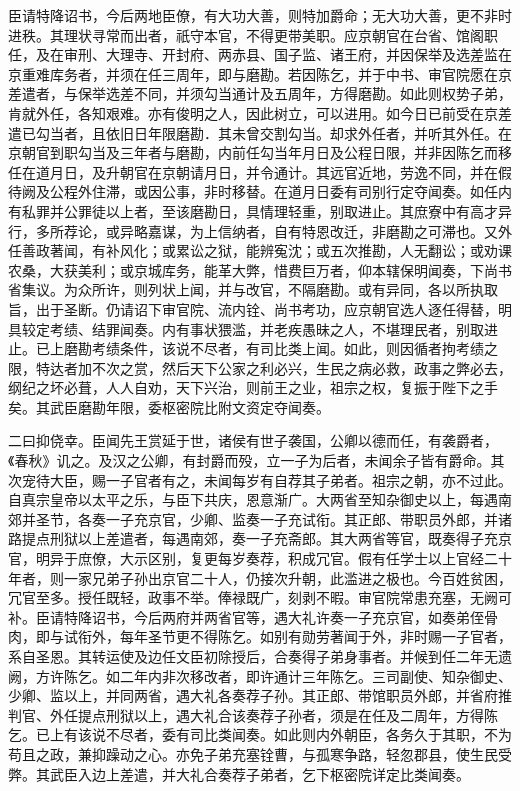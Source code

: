 \documentclass[UTF8,titlepage,oneside]{ctexbook}
\begin{document}
臣请特降诏书，今后两地臣僚，有大功大善，则特加爵命；无大功大善，更不非时进秩。其理状寻常而出者，祇守本官，不得更带美职。应京朝官在台省、馆阁职任，及在审刑、大理寺、开封府、两赤县、国子监、诸王府，并因保举及选差监在京重难库务者，并须在任三周年，即与磨勘。若因陈乞，并于中书、审官院愿在京差遣者，与保举选差不同，并须勾当通计及五周年，方得磨勘。如此则权势子弟，肯就外任，各知艰难。亦有俊明之人，因此树立，可以进用。如今日已前受在京差遣已勾当者，且依旧日年限磨勘．其未曾交割勾当。却求外任者，并听其外任。在京朝官到职勾当及三年者与磨勘，内前任勾当年月日及公程日限，并非因陈乞而移任在道月日，及升朝官在京朝请月日，并令通计。其远官近地，劳逸不同，并在假待阙及公程外住滞，或因公事，非时移替。在道月日委有司别行定夺闻奏。如任内有私罪并公罪徒以上者，至该磨勘日，具情理轻重，别取进止。其庶寮中有高才异行，多所荐论，或异略嘉谋，为上信纳者，自有特恩改迁，非磨勘之可滞也。又外任善政著闻，有补风化；或累讼之狱，能辨寃沈；或五次推勘，人无翻讼；或劝课农桑，大获美利；或京城库务，能革大弊，惜费巨万者，仰本辖保明闻奏，下尚书省集议。为众所许，则列状上闻，并与改官，不隔磨勘。或有异同，各以所执取旨，出于圣断。仍请诏下审官院、流内铨、尚书考功，应京朝官选人逐任得替，明具较定考绩、结罪闻奏。内有事状猥滥，并老疾愚昧之人，不堪理民者，别取进止。已上磨勘考绩条件，该说不尽者，有司比类上闻。如此，则因循者拘考绩之限，特达者加不次之赏，然后天下公家之利必兴，生民之病必救，政事之弊必去，纲纪之坏必葺，人人自劝，天下兴治，则前王之业，祖宗之权，复振于陛下之手矣。其武臣磨勘年限，委枢密院比附文资定夺闻奏。


二曰抑侥幸。臣闻先王赏延于世，诸侯有世子袭国，公卿以德而任，有袭爵者，《春秋》讥之。及汉之公卿，有封爵而殁，立一子为后者，未闻余子皆有爵命。其次宠待大臣，赐一子官者有之，未闻每岁有自荐其子弟者。祖宗之朝，亦不过此。自真宗皇帝以太平之乐，与臣下共庆，恩意渐广。大两省至知杂御史以上，每遇南郊并圣节，各奏一子充京官，少卿、监奏一子充试衔。其正郎、带职员外郎，并诸路提点刑狱以上差遣者，每遇南郊，奏一子充斋郎。其大两省等官，既奏得子充京官，明异于庶僚，大示区别，复更每岁奏荐，积成冗官。假有任学士以上官经二十年者，则一家兄弟子孙出京官二十人，仍接次升朝，此滥进之极也。今百姓贫困，冗官至多。授任既轻，政事不举。俸禄既广，刻剥不暇。审官院常患充塞，无阙可补。臣请特降诏书，今后两府并两省官等，遇大礼许奏一子充京官，如奏弟侄骨肉，即与试衔外，每年圣节更不得陈乞。如别有勋劳著闻于外，非时赐一子官者，系自圣恩。其转运使及边任文臣初除授后，合奏得子弟身事者。并候到任二年无遗阙，方许陈乞。如二年内非次移改者，即许通计三年陈乞。三司副使、知杂御史、少卿、监以上，并同两省，遇大礼各奏荐子孙。其正郎、带馆职员外郎，并省府推判官、外任提点刑狱以上，遇大礼合该奏荐子孙者，须是在任及二周年，方得陈乞。已上有该说不尽者，委有司比类闻奏。如此则内外朝臣，各务久于其职，不为苟且之政，兼抑躁动之心。亦免子弟充塞铨曹，与孤寒争路，轻忽郡县，使生民受弊。其武臣入边上差遣，并大礼合奏荐子弟者，乞下枢密院详定比类闻奏。
\end{document}
